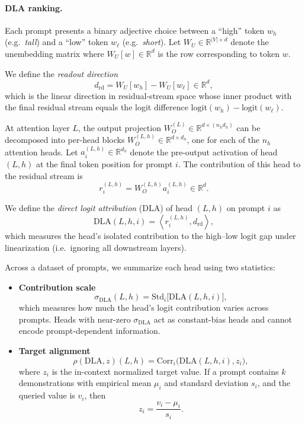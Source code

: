 \documentclass{article}
\begin{document}
\paragraph{DLA ranking.}
Each prompt presents a binary adjective choice between a “high” token $w_h$ (e.g.\ \emph{tall}) and a “low” token $w_\ell$ (e.g.\ \emph{short}). Let $W_U \in \mathbb{R}^{|V|\times d}$ denote the unembedding matrix where $W_U[w] \in \mathbb{R}^d$ is the row corresponding to token $w$.

We define the \emph{readout direction}
\[
d_{\mathrm{rd}} = W_U[w_h] - W_U[w_\ell] \in \mathbb{R}^d,
\]
which is the linear direction in residual-stream space whose inner product with the final residual stream equals the logit difference $\mathrm{logit}(w_h) - \mathrm{logit}(w_\ell)$.

At attention layer $L$, the output projection $W_O^{(L)} \in \mathbb{R}^{d \times (n_h d_h)}$ can be decomposed into per-head blocks $W_O^{(L,h)} \in \mathbb{R}^{d \times d_h}$, one for each of the $n_h$ attention heads. Let $a_i^{(L,h)} \in \mathbb{R}^{d_h}$ denote the pre-output activation of head $(L,h)$ at the final token position for prompt $i$. The contribution of this head to the residual stream is
\[
r_i^{(L,h)} = W_O^{(L,h)} a_i^{(L,h)} \in \mathbb{R}^d.
\]

We define the \emph{direct logit attribution} (DLA) of head $(L,h)$ on prompt $i$ as
\[
\mathrm{DLA}(L,h,i) = \left\langle r_i^{(L,h)}, d_{\mathrm{rd}} \right\rangle,
\]
which measures the head’s isolated contribution to the high--low logit gap under linearization (i.e.\ ignoring all downstream layers).

\medskip

Across a dataset of prompts, we summarize each head using two statistics:
\begin{itemize}
    \item \textbf{Contribution scale}
    \[
    \sigma_{\mathrm{DLA}}(L,h) = \mathrm{Std}_i\big[\mathrm{DLA}(L,h,i)\big],
    \]
    which measures how much the head’s logit contribution varies across prompts. Heads with near-zero $\sigma_{\mathrm{DLA}}$ act as constant-bias heads and cannot encode prompt-dependent information.

    \item \textbf{Target alignment}
    \[
    \rho(\mathrm{DLA}, z)(L,h) = \mathrm{Corr}_i\big(\mathrm{DLA}(L,h,i), z_i\big),
    \]
    where $z_i$ is the in-context normalized target value. If a prompt contains $k$ demonstrations with empirical mean $\mu_i$ and standard deviation $s_i$, and the queried value is $v_i$, then
    \[
    z_i = \frac{v_i - \mu_i}{s_i}.
    \]
\end{itemize}
\end{document}
